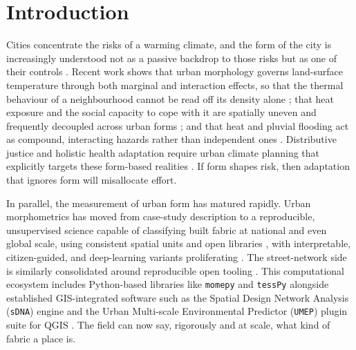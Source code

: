 \section{Introduction}
\label{sec:intro}

Cities concentrate the risks of a warming climate, and the form of the city is
increasingly understood not as a passive backdrop to those risks but as one of
their controls \citep{hamin2009UrbanForm, reckien2018CitiesPlanning}. Recent work shows that urban morphology governs land-surface
temperature through both marginal and interaction effects, so that the thermal
behaviour of a neighbourhood cannot be read off its density alone
\citep{wangZ2025MarginalInteraction}; that heat exposure and the social capacity
to cope with it are spatially uneven and frequently decoupled across urban forms
\citep{turner2025Guhvi, iqbal2025HeatStress}; and that heat and pluvial flooding
act as compound, interacting hazards rather than independent ones
\citep{imroz2025IntegratedAssess}. Distributive justice and holistic health
adaptation require urban climate planning that explicitly targets these form-based
realities \citep{chu2025EvaluatiCities, o2026CitiesNeed}. If form shapes risk,
then adaptation that ignores form will misallocate effort.

In parallel, the measurement of urban form has matured rapidly. Urban
morphometrics has moved from case-study description to a reproducible,
unsupervised science capable of classifying built fabric at national and even
global scale, using consistent spatial units and open libraries
\citep{fleischmann2020Morphologic, fleischmann2022MethodolFoundati,
araldi2025MultiLevel, debray2025UniversalPatterns}, with interpretable, citizen-guided,
and deep-learning variants proliferating \citep{vartholomaios2025Detection,
fang2024Urbanclassifier, wangJ2024FigureGround, campomanes2026WhoseCity}. The
street-network side is similarly consolidated around reproducible open tooling
\citep{boeing2017Osmnx, boeing2025ModelingNetworks}. This computational ecosystem includes Python-based libraries like \texttt{momepy} and \texttt{tessPy} \citep{tesspy_zenodo} alongside established GIS-integrated software such as the Spatial Design Network Analysis (\texttt{sDNA}) engine and the Urban Multi-scale Environmental Predictor (\texttt{UMEP}) plugin suite for QGIS \citep{cooper2020sDNA, lindberg2018UMEP}. The field can now say,
rigorously and at scale, what kind of fabric a place is.

